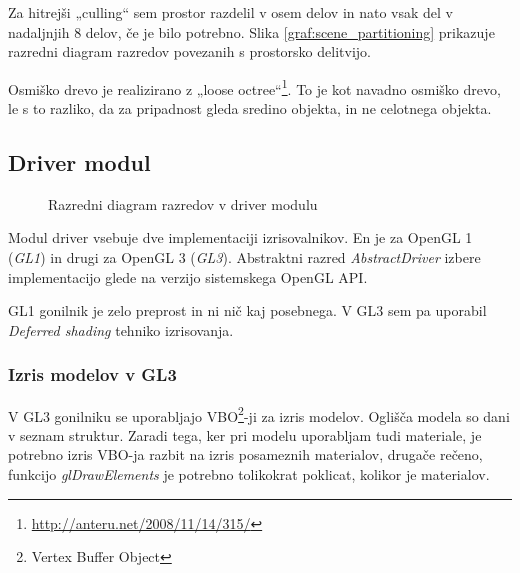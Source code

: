\documentclass[a4paper]{article}
\begin{document}
Za hitrejši „culling“ sem prostor razdelil v osem delov in nato vsak del v nadaljnjih 8 delov, če je bilo potrebno. Slika \ref{graf:scene_partitioning} prikazuje razredni diagram razredov povezanih s prostorsko delitvijo.

Osmiško drevo je realizirano z „loose octree“\footnote{\href{http://anteru.net/2008/11/14/315/}{http://anteru.net/2008/11/14/315/}}. To je kot navadno osmiško drevo, le s to razliko, da za pripadnost gleda sredino objekta, in ne celotnega objekta.

\subsection{Driver modul}
\begin{figure}
  \centering
  
  \label{graf:class_driver}
  \caption{Razredni diagram razredov v driver modulu}
\end{figure}

Modul driver vsebuje dve implementaciji izrisovalnikov. En je za OpenGL 1 (\emph{GL1}) in drugi za OpenGL 3 (\emph{GL3}). Abstraktni razred \emph{AbstractDriver} izbere implementacijo glede na verzijo sistemskega OpenGL API.

GL1 gonilnik je zelo preprost in ni nič kaj posebnega. V GL3 sem pa uporabil \emph{Deferred shading} tehniko izrisovanja.

\subsubsection{Izris modelov v GL3}
V GL3 gonilniku se uporabljajo VBO\footnote{Vertex Buffer Object}-ji za izris modelov. Oglišča modela so dani v seznam struktur. Zaradi tega, ker pri modelu uporabljam tudi materiale, je potrebno izris VBO-ja razbit na izris posameznih materialov, drugače rečeno, funkcijo \emph{glDrawElements} je potrebno tolikokrat poklicat, kolikor je materialov.
\end{document}
